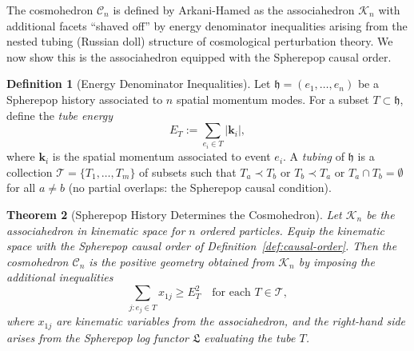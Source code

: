 \documentclass[12pt, oneside]{amsart}
\theoremstyle{plain}
\newtheorem{theorem}{Theorem}[section]
\theoremstyle{definition}
\newtheorem{definition}[theorem]{Definition}
\theoremstyle{remark}
\newcommand{\hist}{\mathfrak{h}}
\newcommand{\Log}{\mathfrak{L}}
\newcommand{\Assoc}{\mathcal{K}_n}
\newcommand{\Cosmo}{\mathcal{C}_n}
\begin{document}
The cosmohedron $\Cosmo$ is defined by Arkani-Hamed as the associahedron $\Assoc$ with additional facets ``shaved off'' by energy denominator inequalities arising from the nested tubing (Russian doll) structure of cosmological perturbation theory. We now show this is the associahedron equipped with the Spherepop causal order.

\begin{definition}[Energy Denominator Inequalities]
\label{def:energy-denom}
Let $\hist = (e_1, \ldots, e_n)$ be a Spherepop history associated to $n$ spatial momentum modes. For a subset $T \subset \hist$, define the \emph{tube energy}
\[
  E_T := \sum_{e_i \in T} |\mathbf{k}_i|,
\]
where $\mathbf{k}_i$ is the spatial momentum associated to event $e_i$. A \emph{tubing} of $\hist$ is a collection $\mathcal{T} = \{T_1, \ldots, T_m\}$ of subsets such that $T_a \prec T_b$ or $T_b \prec T_a$ or $T_a \cap T_b = \emptyset$ for all $a \neq b$ (no partial overlaps: the Spherepop causal condition).
\end{definition}

\begin{theorem}[Spherepop History Determines the Cosmohedron]
\label{thm:cosmo}
Let $\Assoc$ be the associahedron in kinematic space for $n$ ordered particles. Equip the kinematic space with the Spherepop causal order of Definition~\ref{def:causal-order}. Then the cosmohedron $\Cosmo$ is the positive geometry obtained from $\Assoc$ by imposing the additional inequalities
\begin{equation}
\label{eq:cosmo-ineq}
  \sum_{j: e_j \in T} x_{1j} \geq E_T^2 \quad \text{for each } T \in \mathcal{T},
\end{equation}
where $x_{1j}$ are kinematic variables from the associahedron, and the right-hand side arises from the Spherepop log functor $\Log$ evaluating the tube $T$.
\end{theorem}
\end{document}
